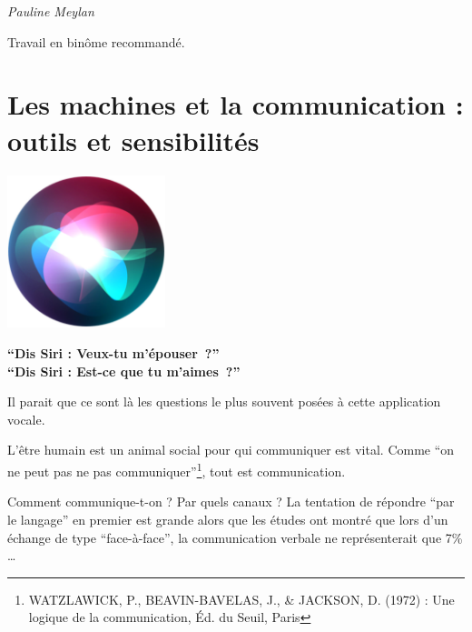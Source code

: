 \documentclass[
  10pt,
  french,
  a5paper,
  openany]{book}
\newenvironment{signature}{\begin{flushright}}{\end{flushright}}
\begin{document}
\begin{signature}
\emph{Pauline Meylan}

\end{signature}

Travail en binôme recommandé.

\hypertarget{les-machines-et-la-communication-outils-et-sensibilituxe9s}{%
\chapter{\texorpdfstring{Les machines et la communication : \linebreak outils et sensibilités}{Les machines et la communication : outils et sensibilités}}\label{les-machines-et-la-communication-outils-et-sensibilituxe9s}}

\begin{center}
\includegraphics[width=\textwidth,height=12em]{images/les-machines-et-la-communication.jpg}

\end{center}

\begin{center}
\textbf{``Dis Siri : Veux-tu m'épouser~?''}\\
\textbf{``Dis Siri : Est-ce que tu m'aimes~?''}

\end{center}

Il parait que ce sont là les questions le plus souvent posées à cette application vocale.

L'être humain est un animal social pour qui communiquer est vital. Comme ``on ne peut pas ne pas
communiquer''\footnote{WATZLAWICK, P., BEAVIN-BAVELAS, J., \& JACKSON, D. (1972) : Une logique de la communication, Éd. du Seuil, Paris}, tout est communication.

Comment communique-t-on ? Par quels canaux ? La tentation de répondre ``par le langage'' en premier est grande alors que les études ont montré que lors d'un échange de type ``face-à-face'', la communication verbale ne représenterait que 7\% \ldots{}
\end{document}
